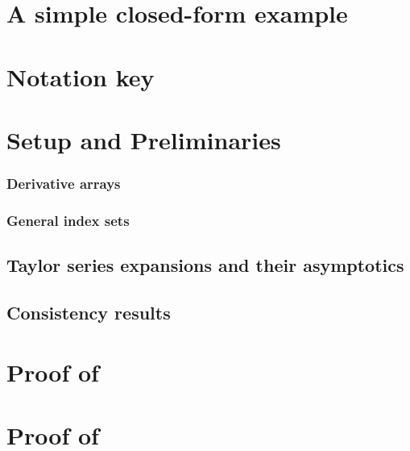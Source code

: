 \documentclass[12pt]{article} %
\begin{document}
\section{A simple closed-form example}



\section{Notation key}


\section{Setup and Preliminaries}

\subsubsection{Derivative arrays}


\subsubsection{General index sets}


\subsection{Taylor series expansions and their asymptotics}


\subsection{Consistency results}




\section{Proof of }


\section{Proof of }

\end{document}
